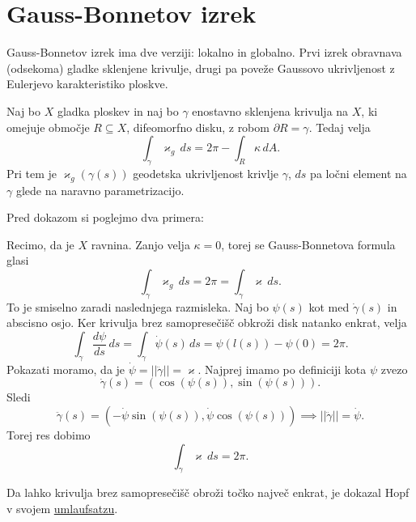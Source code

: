 \section{Gauss-Bonnetov izrek}

Gauss-Bonnetov izrek ima dve verziji: lokalno in globalno. Prvi izrek obravnava (odsekoma) gladke sklenjene krivulje, drugi pa poveže Gaussovo ukrivljenost z Eulerjevo karakteristiko ploskve.

\begin{izrek}
\label{izr_lokalna_verzija_GB_izreka}
 Naj bo $X$ gladka ploskev in naj bo $\gamma$ enostavno sklenjena krivulja na $X$, ki omejuje območje $R \subseteq  X$, difeomorfno disku, z robom $\partial R = \gamma$. 
 Tedaj velja \begin{equation*}
 \int_{\gamma} \varkappa_g \, ds = 2 \pi - \int_{R} \kappa \, dA.
 \end{equation*}  
Pri tem je $\varkappa_g(\gamma(s))$ geodetska ukrivljenost krivlje $\gamma$, $ds$ pa ločni element na $\gamma$ glede na naravno parametrizacijo. 
\end{izrek}

Pred dokazom si poglejmo dva primera:
\begin{primer}
Recimo, da je $X$ ravnina. Zanjo velja $\kappa = 0$, torej se Gauss-Bonnetova formula glasi \begin{equation*}
    \int_{\gamma} \varkappa_g \, ds = 2 \pi = \int_{\gamma} \varkappa \, ds.
\end{equation*}  
To je smiselno zaradi naslednjega razmisleka. Naj bo $\psi(s)$ kot med $\dot{\gamma}(s)$ in abscisno osjo. Ker krivulja brez samopresečišč obkroži disk natanko enkrat, velja \begin{equation*}
\int_{\gamma} \frac{ d \psi }{ ds }   \, ds = \int_{\gamma}  \dot{\psi}(s) \, ds = \psi(l(s)) - \psi(0) = 2 \pi. 
\end{equation*}
Pokazati moramo, da je $\dot{\psi} = \lvert\lvert \ddot{\gamma} \rvert\rvert = \varkappa$. Najprej imamo po definiciji kota $\psi$ zvezo \begin{equation*}
    \dot{\gamma}(s) = (\cos(\psi(s)), \sin(\psi(s))).
\end{equation*} 
Sledi \begin{equation*}
\ddot{\gamma}(s) = (- \dot{\psi} \sin(\psi(s)), \dot{\psi} \cos(\psi(s))) \implies \lvert\lvert \ddot{\gamma} \rvert\rvert = \dot{\psi}.
\end{equation*}  
Torej res dobimo \begin{equation*}
    \int_{\gamma} \varkappa \, ds = 2 \pi.
\end{equation*}  

\begin{opomba}
Da lahko krivulja brez samopresečišč obroži točko največ enkrat, je dokazal Hopf v svojem \href{https://de.wikipedia.org/wiki/Umlaufsatz}{umlaufsatzu}.  
\end{opomba}
\end{primer}


